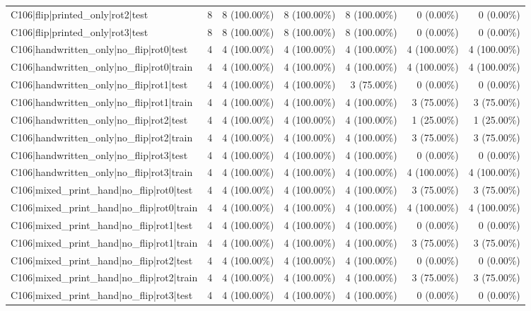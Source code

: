 \begin{longtable}{>{\raggedright\arraybackslash}p{5cm}rrrrrr}
C106|flip|printed\_only|rot2|test & 8 & 8 (100.00\%) & 8 (100.00\%) & 8 (100.00\%) & 0 (0.00\%) & 0 (0.00\%) \\
C106|flip|printed\_only|rot3|test & 8 & 8 (100.00\%) & 8 (100.00\%) & 8 (100.00\%) & 0 (0.00\%) & 0 (0.00\%) \\
C106|handwritten\_only|no\_flip|rot0|test & 4 & 4 (100.00\%) & 4 (100.00\%) & 4 (100.00\%) & 4 (100.00\%) & 4 (100.00\%) \\
C106|handwritten\_only|no\_flip|rot0|train & 4 & 4 (100.00\%) & 4 (100.00\%) & 4 (100.00\%) & 4 (100.00\%) & 4 (100.00\%) \\
C106|handwritten\_only|no\_flip|rot1|test & 4 & 4 (100.00\%) & 4 (100.00\%) & 3 (75.00\%) & 0 (0.00\%) & 0 (0.00\%) \\
C106|handwritten\_only|no\_flip|rot1|train & 4 & 4 (100.00\%) & 4 (100.00\%) & 4 (100.00\%) & 3 (75.00\%) & 3 (75.00\%) \\
C106|handwritten\_only|no\_flip|rot2|test & 4 & 4 (100.00\%) & 4 (100.00\%) & 4 (100.00\%) & 1 (25.00\%) & 1 (25.00\%) \\
C106|handwritten\_only|no\_flip|rot2|train & 4 & 4 (100.00\%) & 4 (100.00\%) & 4 (100.00\%) & 3 (75.00\%) & 3 (75.00\%) \\
C106|handwritten\_only|no\_flip|rot3|test & 4 & 4 (100.00\%) & 4 (100.00\%) & 4 (100.00\%) & 0 (0.00\%) & 0 (0.00\%) \\
C106|handwritten\_only|no\_flip|rot3|train & 4 & 4 (100.00\%) & 4 (100.00\%) & 4 (100.00\%) & 4 (100.00\%) & 4 (100.00\%) \\
C106|mixed\_print\_hand|no\_flip|rot0|test & 4 & 4 (100.00\%) & 4 (100.00\%) & 4 (100.00\%) & 3 (75.00\%) & 3 (75.00\%) \\
C106|mixed\_print\_hand|no\_flip|rot0|train & 4 & 4 (100.00\%) & 4 (100.00\%) & 4 (100.00\%) & 4 (100.00\%) & 4 (100.00\%) \\
C106|mixed\_print\_hand|no\_flip|rot1|test & 4 & 4 (100.00\%) & 4 (100.00\%) & 4 (100.00\%) & 0 (0.00\%) & 0 (0.00\%) \\
C106|mixed\_print\_hand|no\_flip|rot1|train & 4 & 4 (100.00\%) & 4 (100.00\%) & 4 (100.00\%) & 3 (75.00\%) & 3 (75.00\%) \\
C106|mixed\_print\_hand|no\_flip|rot2|test & 4 & 4 (100.00\%) & 4 (100.00\%) & 4 (100.00\%) & 0 (0.00\%) & 0 (0.00\%) \\
C106|mixed\_print\_hand|no\_flip|rot2|train & 4 & 4 (100.00\%) & 4 (100.00\%) & 4 (100.00\%) & 3 (75.00\%) & 3 (75.00\%) \\
C106|mixed\_print\_hand|no\_flip|rot3|test & 4 & 4 (100.00\%) & 4 (100.00\%) & 4 (100.00\%) & 0 (0.00\%) & 0 (0.00\%) \\

\end{longtable}
